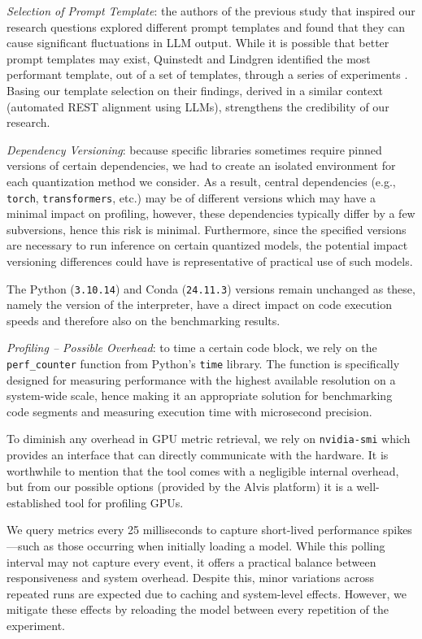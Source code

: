 \documentclass[conference]{IEEEtran}
\begin{document}
\textit{Selection of Prompt Template}: the authors of the previous study that inspired our research questions explored different prompt templates and found that they can cause significant fluctuations in LLM output\cite{quinstedt2024Optimizing}. While it is possible that better prompt templates may exist, Quinstedt and Lindgren identified the most performant template, out of a set of templates, through a series of experiments \cite{quinstedt2024Optimizing}. Basing our template selection on their findings, derived in a similar context (automated REST alignment using LLMs), strengthens the credibility of our research.

\textit{Dependency Versioning}: because specific libraries sometimes require pinned versions of certain dependencies, we had to create an isolated environment for each quantization method we consider. As a result, central dependencies (e.g., \verb|torch|, \verb|transformers|, etc.) may be of different versions which may have a minimal impact on profiling, however, these dependencies typically differ by a few subversions, hence this risk is minimal. Furthermore, since the specified versions are necessary to run inference on certain quantized models, the potential impact versioning differences could have is representative of practical use of such models.

The Python (\verb|3.10.14|) and Conda (\verb|24.11.3|) versions remain unchanged as these, namely the version of the interpreter, have a direct impact on code execution speeds and therefore also on the benchmarking results.

\textit{Profiling -- Possible Overhead}: to time a certain code block, we rely on the \verb|perf_counter| function from Python's \verb|time| library. The function is specifically designed for measuring performance with the highest available resolution on a system-wide scale, hence making it an appropriate solution for benchmarking code segments and measuring execution time with microsecond precision.

To diminish any overhead in GPU metric retrieval, we rely on \verb|nvidia-smi| which provides an interface that can directly communicate with the hardware. It is worthwhile to mention that the tool comes with a negligible internal overhead, but from our possible options (provided by the Alvis platform) it is a well-established tool for profiling GPUs. 

We query metrics every 25 milliseconds to capture short-lived performance spikes—such as those occurring when initially loading a model. While this polling interval may not capture every event, it offers a practical balance between responsiveness and system overhead. Despite this, minor variations across repeated runs are expected due to caching and system-level effects. However, we mitigate these effects by reloading the model between every repetition of the experiment. 
\end{document}
